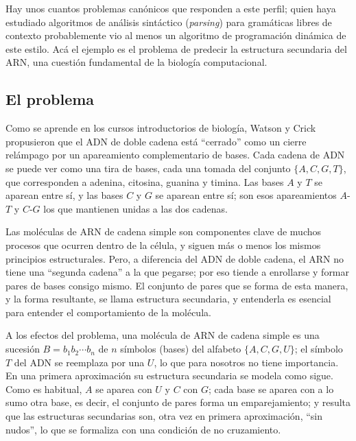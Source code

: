 \documentclass[12pt, spanish, oneside, openany]{book}
\theoremstyle{uprightplain}
\theoremstyle{definition}
\theoremstyle{remark}
\theoremstyle{definition}
\begin{document}
Hay unos cuantos problemas canónicos que responden a este perfil; quien haya estudiado algoritmos de análisis sintáctico (\emph{parsing}) para gramáticas libres de contexto probablemente vio al menos un algoritmo de programación dinámica de este estilo. Acá el ejemplo es el problema de predecir la estructura secundaria del ARN, una cuestión fundamental de la biología computacional.

\subsection{El problema}

Como se aprende en los cursos introductorios de biología, Watson y Crick propusieron que el ADN de doble cadena está ``cerrado'' como un cierre relámpago por un apareamiento complementario de bases. Cada cadena de ADN se puede ver como una tira de bases, cada una tomada del conjunto $\{A,C,G,T\}$, que corresponden a adenina, citosina, guanina y timina. Las bases $A$ y $T$ se aparean entre sí, y las bases $C$ y $G$ se aparean entre sí; son esos apareamientos $A$-$T$ y $C$-$G$ los que mantienen unidas a las dos cadenas.

Las moléculas de ARN de cadena simple son componentes clave de muchos procesos que ocurren dentro de la célula, y siguen más o menos los mismos principios estructurales. Pero, a diferencia del ADN de doble cadena, el ARN no tiene una ``segunda cadena'' a la que pegarse; por eso tiende a enrollarse y formar pares de bases consigo mismo. El conjunto de pares que se forma de esta manera, y la forma resultante, se llama estructura secundaria, y entenderla es esencial para entender el comportamiento de la molécula.

A los efectos del problema, una molécula de ARN de cadena simple es una sucesión $B=b_1b_2\cdots b_n$ de $n$ símbolos (bases) del alfabeto $\{A,C,G,U\}$; el símbolo $T$ del ADN se reemplaza por una $U$, lo que para nosotros no tiene importancia. En una primera aproximación su estructura secundaria se modela como sigue. Como es habitual, $A$ se aparea con $U$ y $C$ con $G$; cada base se aparea con a lo sumo otra base, es decir, el conjunto de pares forma un emparejamiento; y resulta que las estructuras secundarias son, otra vez en primera aproximación, ``sin nudos'', lo que se formaliza con una condición de no cruzamiento.
\end{document}
